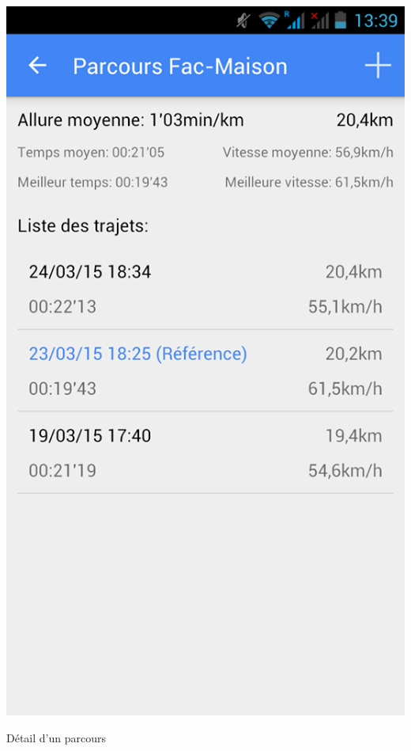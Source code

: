 \begin{multicols}{2}
\begin{img}
  \includegraphics[scale=0.35]{img/parcours.jpg}
  \caption{Détail d'un parcours}
\end{img}
\begin{img}

\end{img}
\end{multicols}
